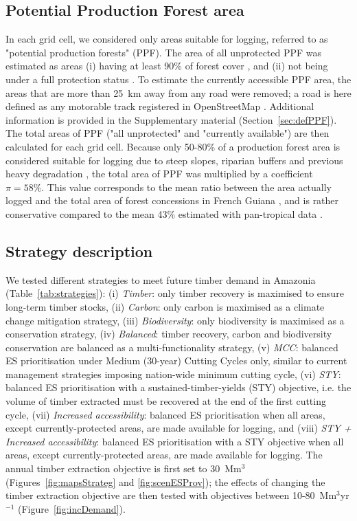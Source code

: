 \documentclass[12pt]{article}
\begin{document}
\subsection*{Potential Production Forest area}
\label{sec:ppf}

In each grid cell, we considered only areas suitable for logging, referred to as "potential production forests" (PPF). The area of all unprotected PPF was estimated as areas (i) having at least 90\% of forest cover \cite{Hansen2013}, and (ii) not being under a full protection status \cite{WDPA2016}. To estimate the currently accessible PPF area, the areas that are more than 25~km away from any road were removed; a road is here defined as any motorable track registered in OpenStreetMap \cite{OSM2018}. Additional information is provided in the Supplementary material (Section~\ref{sec:defPPF}). 
The total areas of PPF ("all unprotected" and "currently available") are then calculated for each grid cell. Because only 50-80\% of a production forest area is considered suitable for logging due to steep slopes, riparian buffers and previous heavy degradation \cite{Feldpausch2006,Verissimo2002}, the total area of PPF was multiplied by a coefficient $\pi = 58\%$. This value corresponds to the mean ratio between the area actually logged and the total area of forest concessions in French Guiana \cite{Piponiot2019}, and is rather conservative compared to the mean 43\% estimated with pan-tropical data \cite{Putz2019}.

\subsection*{Strategy description}

We tested different strategies to meet future timber demand in Amazonia (Table~\ref{tab:strategies}): (i) \textit{Timber}: only timber recovery is maximised to ensure long-term timber stocks, (ii) \textit{Carbon}: only carbon is maximised as a climate change mitigation strategy, (iii) \textit{Biodiversity}: only biodiversity is maximised as a conservation strategy, (iv) \textit{Balanced}: timber recovery, carbon and biodiversity conservation are balanced as a multi-functionality strategy, (v) \textit{MCC}: balanced ES prioritisation under Medium (30-year) Cutting Cycles only, similar to current management strategies imposing nation-wide minimum cutting cycle, (vi) \textit{STY}: balanced ES prioritisation with a sustained-timber-yields (STY) objective, i.e. the volume of timber extracted must be recovered at the end of the first cutting cycle, (vii) \textit{Increased accessibility}: balanced ES prioritisation when all areas, except currently-protected areas, are made available for logging, and (viii) \textit{STY + Increased accessibility}: balanced ES prioritisation with a STY objective when all areas, except currently-protected areas, are made available for logging. The annual timber extraction objective is first set to 30~Mm$^3$ (Figures~\ref{fig:mapsStrateg} and \ref{fig:scenESProv}); the effects of changing the timber extraction objective are then tested with objectives between 10-80~Mm$^3$yr$^{-1}$ (Figure~\ref{fig:incDemand}). 
\end{document}
